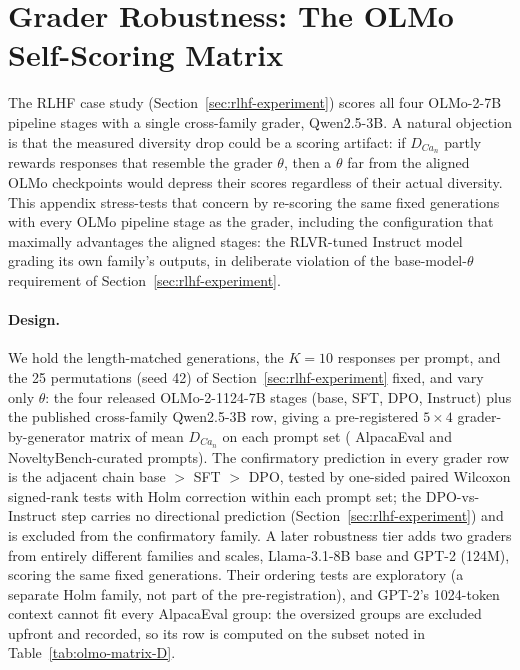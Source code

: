 \section{Grader Robustness: The OLMo Self-Scoring Matrix}\label{app:olmo-self-scoring}

The RLHF case study (Section~\ref{sec:rlhf-experiment}) scores all four OLMo-2-7B pipeline stages with a single cross-family grader, Qwen2.5-3B.
A natural objection is that the measured diversity drop could be a scoring artifact: if $D_{Ca_n}$ partly rewards responses that resemble the grader $\theta$, then a $\theta$ far from the aligned OLMo checkpoints would depress their scores regardless of their actual diversity.
This appendix stress-tests that concern by re-scoring the same fixed generations with every OLMo pipeline stage as the grader, including the configuration that maximally advantages the aligned stages: the RLVR-tuned Instruct model grading its own family's outputs, in deliberate violation of the base-model-$\theta$ requirement of Section~\ref{sec:rlhf-experiment}.

\paragraph{Design.}
We hold the length-matched generations, the ${K{=}10}$ responses per prompt, and the 25 permutations (seed 42) of Section~\ref{sec:rlhf-experiment} fixed, and vary only $\theta$: the four released OLMo-2-1124-7B stages (base, SFT, DPO, Instruct) plus the published cross-family Qwen2.5-3B row, giving a pre-registered $5 \times 4$ grader-by-generator matrix of mean $D_{Ca_n}$ on each prompt set (\olmoMxAlpacaN{} AlpacaEval and \olmoMxNbN{} NoveltyBench-curated prompts).
The confirmatory prediction in every grader row is the adjacent chain base $>$ SFT $>$ DPO, tested by one-sided paired Wilcoxon signed-rank tests with Holm correction within each prompt set; the DPO-vs-Instruct step carries no directional prediction (Section~\ref{sec:rlhf-experiment}) and is excluded from the confirmatory family.
A later robustness tier adds two graders from entirely different families and scales, Llama-3.1-8B base and GPT-2 (124M), scoring the same fixed generations.
Their ordering tests are exploratory (a separate Holm family, not part of the pre-registration), and GPT-2's 1024-token context cannot fit every AlpacaEval group: the oversized groups are excluded upfront and recorded, so its row is computed on the subset noted in Table~\ref{tab:olmo-matrix-D}.

